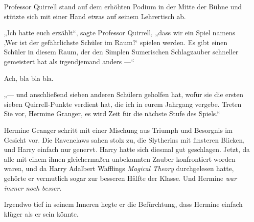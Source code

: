 Professor Quirrell stand auf dem erhöhten Podium in der Mitte der Bühne und stützte sich mit einer Hand etwas auf seinem Lehrertisch ab.

„Ich hatte euch erzählt“, sagte Professor Quirrell, „dass wir ein Spiel namens ‚Wer ist der gefährlichste Schüler im Raum?‘ spielen werden. Es gibt einen Schüler in diesem Raum, der den Simplen Sumerischen Schlagzauber schneller gemeistert hat als irgendjemand anders —“

Ach, bla bla bla.

„— und anschließend sieben anderen Schülern geholfen hat, wofür sie die ersten sieben Quirrell-Punkte verdient hat, die ich in eurem Jahrgang vergebe. Treten Sie vor, Hermine Granger, es wird Zeit für die nächste Stufe des Spiels.“

Hermine Granger schritt mit einer Mischung aus Triumph und Besorgnis im Gesicht vor. Die Ravenclaws sahen stolz zu, die Slytherins mit finsteren Blicken, und Harry einfach nur genervt. Harry hatte sich diesmal gut geschlagen. Jetzt, da alle mit einem ihnen gleichermaßen unbekannten Zauber konfrontiert worden waren, und da Harry Adalbert Wafflings \emph{Magical Theory} durchgelesen hatte, gehörte er vermutlich sogar zur besseren Hälfte der Klasse. Und Hermine \emph{war immer noch besser.}

Irgendwo tief in seinem Inneren hegte er die Befürchtung, dass Hermine einfach klüger als er sein könnte.

